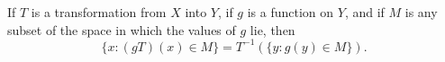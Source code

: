 If $T$ is a transformation from $X$ into $Y$, if $g$ is a function on $Y$, and if $M$ is any subset of the space in which the values of $g$ lie, then
$$\{x: (gT)(x) \in M\} = T^{-1}(\{y: g(y) \in M\}).$$
